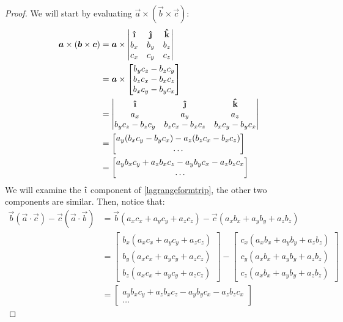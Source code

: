 \begin{proof}
  We will start by evaluating \(\vec{a}\times(\vec{b}\times\vec{c})\):
  \begin{align}
    \vec{a}\times(\vec{b}\times\vec{c}) &= \vec{a}\times\begin{vmatrix}
      \ihat & \jhat & \khat \\
      b_x & b_y & b_z \\
      c_x & c_y & c_z
    \end{vmatrix} \nonumber \\
    &= \vec{a}\times\begin{bmatrix}
      b_yc_z - b_zc_y \\
      b_zc_x - b_xc_z \\
      b_xc_y - b_yc_x
    \end{bmatrix}  \nonumber \\
    &= \begin{vmatrix}
      \ihat & \jhat & \khat \\
      a_x & a_y & a_z \\
      b_yc_z - b_zc_y & b_zc_x - b_xc_z &  b_xc_y - b_yc_x
    \end{vmatrix} \nonumber \\
    &= \begin{bmatrix}
      a_y(b_xc_y - b_yc_x) - a_z(b_zc_x - b_xc_z) \\
      \dots
    \end{bmatrix} \nonumber \\
    &= \begin{bmatrix}
      a_yb_xc_y + a_zb_xc_z - a_yb_yc_x - a_zb_zc_x \\
      \dots
    \end{bmatrix}
    \label{lagrangeformtrip}
  \end{align}
  We will examine the \(\ihat\) component of \ref{lagrangeformtrip}, the other two components are similar. Then, notice that:
  \begin{align}
    \vec{b}(\vec{a}\cdot\vec{c}) - \vec{c}(\vec{a}\cdot\vec{b}) &= \vec{b}(a_xc_x+a_yc_y+a_zc_z) - \vec{c}(a_xb_x+ a_yb_y+ a_zb_z) \nonumber \\
    &= \begin{bmatrix}
      b_x(a_xc_x+a_yc_y+a_zc_z) \\
      b_y(a_xc_x+a_yc_y+a_zc_z) \\
      b_z(a_xc_x+a_yc_y+a_zc_z)
    \end{bmatrix} - \begin{bmatrix}
      c_x(a_xb_x+ a_yb_y+ a_zb_z) \\
      c_y(a_xb_x+ a_yb_y+ a_zb_z) \\
      c_z(a_xb_x+ a_yb_y+ a_zb_z)
    \end{bmatrix} \nonumber \\
    &= \begin{bmatrix}
      a_yb_xc_y + a_zb_xc_z - a_yb_yc_x - a_zb_zc_x \\
      \dots
    \end{bmatrix}
    \label{lagrangeformtripscalar}
  \end{align}



\end{proof}
